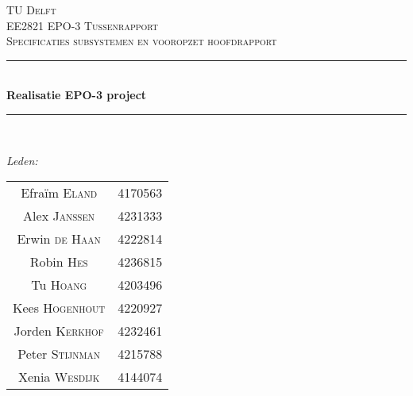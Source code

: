 \documentclass[12pt]{article}
\begin{document}
\begin{titlepage}

\newcommand{\HRule}{\rule{\linewidth}{0.5mm}} %

\center %
 

\textsc{\LARGE TU Delft}\\[1.5cm] %
\textsc{\Large EE2821 EPO-3 Tussenrapport}\\[0.5cm] %
\textsc{\large Specificaties subsystemen en vooropzet hoofdrapport}\\[0.5cm] %


\HRule \\[0.4cm]
{ \huge \bfseries Realisatie EPO-3 project}\\[0.2cm] %
\HRule \\[1.5cm]
 

\begin{minipage}{0.4\textwidth}
\begin{flushleft} \large
\emph{Leden:}\\
\begin{tabular}{cc}
Efraïm\textsc{ Eland} & 4170563 \\
Alex \textsc{Janssen} &	4231333\\
Erwin \textsc{de Haan} & 4222814\\
Robin \textsc{Hes}& 4236815\\
Tu \textsc{Hoang} &4203496 \\
Kees \textsc{Hogenhout} & 4220927\\
Jorden \textsc{ Kerkhof} & 4232461\\
Peter \textsc{Stijnman} & 4215788 \\
Xenia \textsc{Wesdijk} & 4144074\\
\end{tabular}


\end{flushleft}
\end{minipage}
\end{titlepage}
\end{document}
